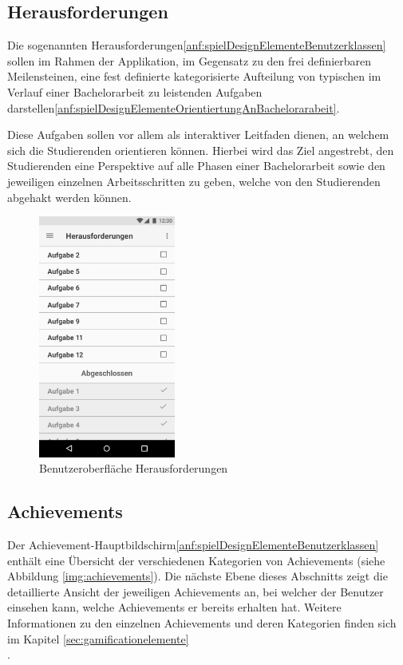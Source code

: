 \documentclass[bibliography=totoc,listof=totoc,BCOR=5mm,DIV=12,oneside]{scrbook}
\begin{document}
\newpage
\subsection{Herausforderungen}
\par Die sogenannten Herausforderungen\ref{anf:spielDesignElementeBenutzerklassen} sollen im Rahmen der Applikation, im Gegensatz zu den frei definierbaren Meilensteinen, eine fest definierte kategorisierte Aufteilung von typischen im Verlauf einer Bachelorarbeit zu leistenden Aufgaben darstellen\ref{anf:spielDesignElementeOrientiertungAnBachelorarabeit}. 
\par Diese Aufgaben sollen vor allem als interaktiver Leitfaden dienen, an welchem sich die Studierenden orientieren können. Hierbei wird das Ziel angestrebt, den Studierenden eine Perspektive auf alle Phasen einer Bachelorarbeit sowie den jeweiligen einzelnen Arbeitsschritten zu geben, welche von den Studierenden abgehakt werden können. 

\begin{figure}[H]
	\centering
	\includegraphics[width=0.4\textwidth, keepaspectratio]{Bilder/Prototyp/AufgabenSortiert.jpg}
	\caption{Benutzeroberfläche Herausforderungen}
	\label{img:aufgaben}
\end{figure}

\newpage
\subsection{Achievements}
\par Der Achievement-Hauptbildschirm\ref{anf:spielDesignElementeBenutzerklassen} enthält eine Übersicht der verschiedenen Kategorien von Achievements (siehe Abbildung \ref{img:achievements}). Die nächste Ebene dieses Abschnitts zeigt die detaillierte Ansicht der jeweiligen Achievements an, bei welcher der Benutzer einsehen kann, welche Achievements er bereits erhalten hat. Weitere Informationen zu den einzelnen Achievements und deren Kategorien finden sich im Kapitel \ref{sec:gamificationelemente}\\.
\end{document}
